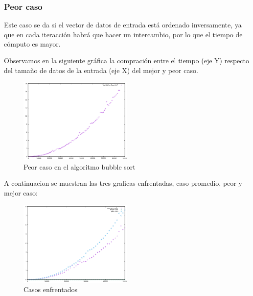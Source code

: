 \subsubsection{Peor caso}

Este caso se da si el vector de datos de entrada está ordenado inversamente, ya que en cada iteracción habrá que hacer un intercambio, por lo que el tiempo de cómputo es mayor.

Observamos en la siguiente gráfica la compración entre el tiempo (eje Y) respecto del tamaño de datos de la entrada (eje X) del mejor y peor caso.

\begin{figure}[ht]
  \centering
  \includegraphics[width=0.5\textwidth]{./Imagenes/peorCaso.png}
  \caption{Peor caso en el algoritmo bubble sort}
\end{figure}


A continuacion se muestran las tres graficas enfrentadas, caso promedio, peor y mejor caso:

\begin{figure}[ht]
  \centering
  \includegraphics[width=0.5\textwidth]{./Imagenes/casosEnfrentados.png}
  \caption{Casos enfrentados}
\end{figure}
